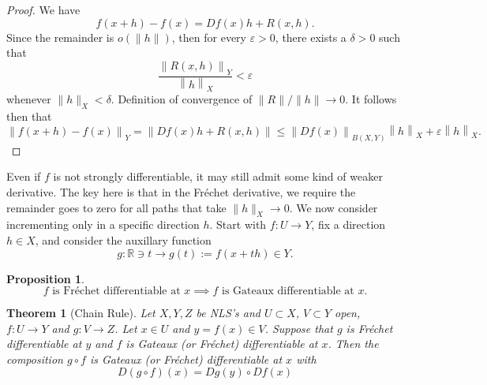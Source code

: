 \documentclass[letterpaper,twoside,12pt]{article}
\theoremstyle{mystyle}
\newtheorem{theorem}{Theorem}[section]
\newtheorem{prop}{Proposition}[section]
\newcommand{\R}{{\mathbb R}}
\newcommand{\cg}{\color{gray}}
\newcommand{\cbk}{\color{black}}
\newcommand{\ve}{\varepsilon}
\begin{document}
  \begin{proof}
    We have 
    \begin{equation}
      f\left( {x + h} \right) - f\left( x \right) = Df\left( x \right)h + R\left( {x,h} \right).
    \end{equation}
    Since the remainder is $o(\|h\|)$, then for every $\ve > 0$, there exists a $\delta > 0$ such that 
    \begin{equation}
      \frac{{{{\left\| {R\left( {x,h} \right)} \right\|}_Y}}}{{{{\left\| h \right\|}_X}}} < \ve
    \end{equation}
    whenever $\|h\|_X < \delta$. \cg Definition of convergence of $\|R\| /\|h\| \to 0$. \cbk It follows then that 
    \begin{equation}
      {\left\| {f\left( {x + h} \right) - f\left( x \right)} \right\|_Y} = \left\| {Df\left( x \right)h + R\left( {x,h} \right)} \right\| \leqslant {\left\| {Df\left( x \right)} \right\|_{B\left( {X,Y} \right)}}{\left\| h \right\|_X} + \varepsilon {\left\| h \right\|_X}.
    \end{equation}
  \end{proof}
  Even if $f$ is not strongly differentiable, it may still admit some kind of weaker derivative. The key here is that in the Fr\'echet derivative, we require the remainder goes to zero for all paths that take $\|h\|_X \to 0$. We now consider incrementing only in a specific direction $h$. Start with $f:U \to Y$, fix a direction $h \in X$, and consider the auxillary function 
  \begin{equation}
    g:\R \ni t \to g(t) := f(x + th) \in Y.
  \end{equation}



  \begin{tcolorbox}[colback=red!5!white,colframe=red!75!black]
    \begin{prop}
      \[f\text{ is Fr\'echet differentiable at }x \implies f\text{ is Gateaux differentiable at }x. \]
    \end{prop}
  \end{tcolorbox}

  \begin{tcolorbox}[colback=red!5!white,colframe=red!75!black]
    \begin{theorem}[Chain Rule]
      Let $X, Y, Z$ be NLS's and $U\subset X$, $V\subset Y$ open, $f : U \to Y$ and $g : V \to Z$. Let $x \in U$ and $y = f(x) \in V$. Suppose that $g$ is Fr\'echet differentiable at $y$ and $f$ is Gateaux (or Fr\'echet) differentiable at $x$. Then the composition $g \circ f$ is Gateaux (or Fr\'echet) differentiable at $x$ with 
      \[D(g\circ f)(x) = Dg(y) \circ Df(x)\]
    \end{theorem}
  \end{tcolorbox}
\end{document}
